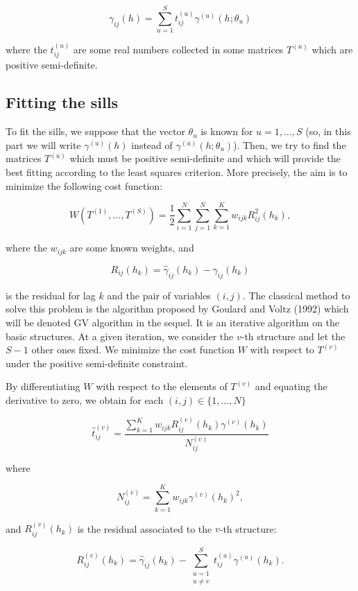 \documentclass[11pt]{article}
\begin{document}
\[
\gamma_{ij}(h) = \sum_{u=1}^S t_{ij}^{(u)} \gamma^{(u)}(h; \theta_u)
\]

where the $t_{ij}^{(u)}$ are some real numbers collected in some matrices $T^{(u)}$ which are positive semi-definite.

\subsection{Fitting the sills}

To fit the sills, we suppose that the vector $\theta_u$ is known for $u = 1, \ldots, S$ (so, in this part we will write $\gamma^{(u)}(h)$ instead of $\gamma^{(u)}(h; \theta_u)$). Then, we try to find the matrices $T^{(u)}$ which must be positive semi-definite and which will provide the best fitting according to the least squares criterion. More precisely, the aim is to minimize the following cost function:

\[
W(T^{(1)}, \ldots, T^{(S)}) = \frac{1}{2} \sum_{i=1}^N \sum_{j=1}^N \sum_{k=1}^K w_{ijk} R_{ij}^2(h_k),
\]

where the $w_{ijk}$ are some known weights, and

\[
R_{ij}(h_k) = \hat{\gamma}_{ij}(h_k) - \gamma_{ij}(h_k)
\]

is the residual for lag $k$ and the pair of variables $(i, j)$. The classical method to solve this problem is the algorithm proposed by Goulard and Voltz (1992) which will be denoted GV algorithm in the sequel. It is an iterative algorithm on the basic structures. At a given iteration, we consider the $v$-th structure and let the $S - 1$ other ones fixed. We minimize the cost function $W$ with respect to $T^{(v)}$ under the positive semi-definite constraint.

By differentiating $W$ with respect to the elements of $T^{(v)}$ and equating the derivative to zero, we obtain for each $(i,j) \in \{1, \ldots, N\}$

\[
\hat{t}_{ij}^{(v)} = \frac{\sum_{k=1}^K w_{ijk} R_{ij}^{(v)}(h_k) \gamma^{(v)}(h_k)}{N_{ij}^{(v)}}
\]

where

\[
N_{ij}^{(v)} = \sum_{k=1}^K w_{ijk} \gamma^{(v)}(h_k)^2,
\]

and $R_{ij}^{(v)}(h_k)$ is the residual associated to the $v$-th structure:

\[
R_{ij}^{(v)}(h_k) = \hat{\gamma}_{ij}(h_k) - \sum_{\substack{u=1 \\ u \neq v}}^S t_{ij}^{(u)} \gamma^{(u)}(h_k).
\]
\end{document}
